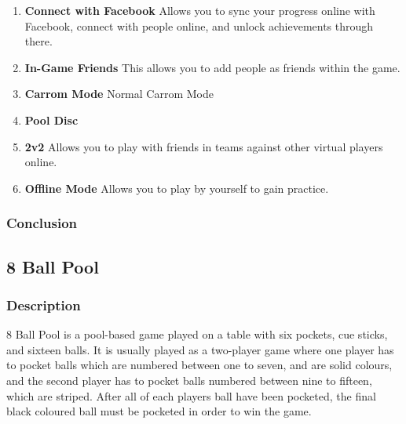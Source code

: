 \documentclass[11pt,a4paper]{report}
\begin{document}
\begin{enumerate}
    \item \textbf{Connect with Facebook} \newline
Allows you to sync your progress online with Facebook, connect with people online, and unlock achievements through there.

    \item \textbf{In-Game Friends} \newline
This allows you to add people as friends within the game.

    \item \textbf{Carrom Mode} \newline
Normal Carrom Mode

    \item \textbf{Pool Disc} \newline


    \item \textbf{2v2} \newline
Allows you to play with friends in teams against other virtual players online.

    \item \textbf{Offline Mode} \newline
Allows you to play by yourself to gain practice.


\end{enumerate}


\subsubsection{Conclusion}

\subsection{8 Ball Pool}

\subsubsection{Description}
8 Ball Pool is a pool-based game played on a table with six pockets, cue sticks, and sixteen balls. It is usually played as a two-player game where one player has to pocket balls which are numbered between one to seven, and are solid colours, and the second player has to pocket balls numbered between nine to fifteen, which are striped. After all of each players ball have been pocketed, the final black coloured ball must be pocketed in order to win the game. \newline
\end{document}
